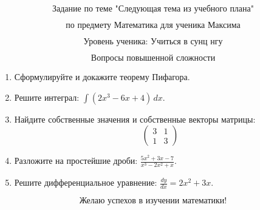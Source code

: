 \documentclass{article}
\begin{document}
\[
\text{Задание по теме "Следующая тема из учебного плана"}    
\]

\[
\text{по предмету Математика для ученика Максима}
\]

\[
\text{Уровень ученика: Учиться в сунц нгу}
\]

\[
\text{Вопросы повышенной сложности}
\]

\begin{enumerate}
    \item Сформулируйте и докажите теорему Пифагора.
    
    \item Решите интеграл: \(\int (2x^3 - 6x + 4) \, dx\).
    
    \item Найдите собственные значения и собственные векторы матрицы:
    \[
    \begin{pmatrix}
    3 & 1 \\
    1 & 3
    \end{pmatrix}
    \]
    
    \item Разложите на простейшие дроби: \(\frac{5x^2 + 3x - 7}{x^3 - 2x^2 + x}\).
    
    \item Решите дифференциальное уравнение: \(\frac{dy}{dx} = 2x^2 + 3x\).
\end{enumerate}

\[
\text{Желаю успехов в изучении математики!}
\]
\end{document}
